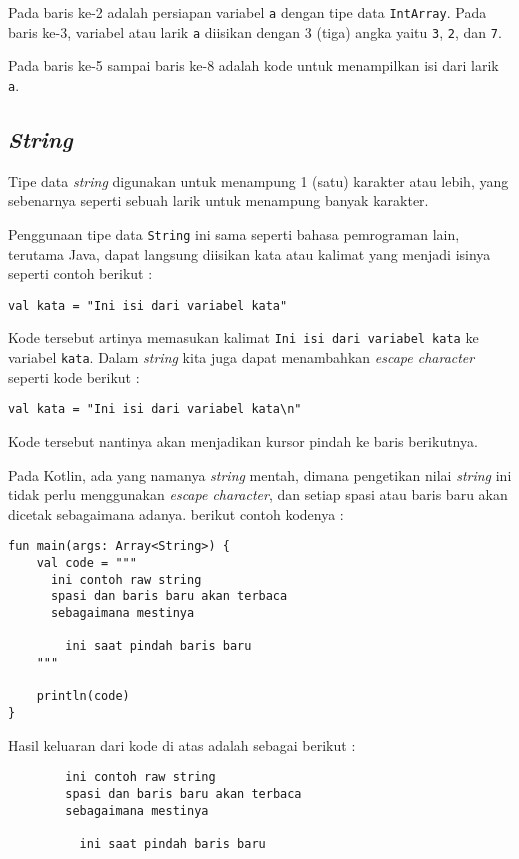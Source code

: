 Pada baris ke-2 adalah persiapan variabel \texttt{a} dengan tipe data \texttt{IntArray}. Pada baris ke-3, variabel atau larik \texttt{a} diisikan dengan 3 (tiga) angka yaitu \texttt{3}, \texttt{2}, dan \texttt{7}.

Pada baris ke-5 sampai baris ke-8 adalah kode untuk menampilkan isi dari larik \texttt{a}.

\subsection{\textit{String}}

Tipe data \textit{string} digunakan untuk menampung 1 (satu) karakter atau lebih, yang sebenarnya seperti sebuah larik untuk menampung banyak karakter.

Penggunaan tipe data \texttt{String} ini sama seperti bahasa pemrograman lain, terutama Java, dapat langsung diisikan kata atau kalimat yang menjadi isinya seperti contoh berikut :

\begin{lstlisting}
val kata = "Ini isi dari variabel kata"
\end{lstlisting}

Kode tersebut artinya memasukan kalimat \texttt{Ini isi dari variabel kata} ke variabel \texttt{kata}. Dalam \textit{string} kita juga dapat menambahkan \textit{escape character} seperti kode berikut :

\begin{lstlisting}
val kata = "Ini isi dari variabel kata\n"
\end{lstlisting}

Kode tersebut nantinya akan menjadikan kursor pindah ke baris berikutnya.

Pada Kotlin, ada yang namanya \textit{string} mentah, dimana pengetikan nilai \textit{string} ini tidak perlu menggunakan \textit{escape character}, dan setiap spasi atau baris baru akan dicetak sebagaimana adanya. berikut contoh kodenya :

\begin{lstlisting}
fun main(args: Array<String>) {
	val code = """
	  ini contoh raw string
	  spasi dan baris baru akan terbaca
	  sebagaimana mestinya
	  
	    ini saat pindah baris baru
	"""
	
	println(code)
}
\end{lstlisting}

Hasil keluaran dari kode di atas adalah sebagai berikut :

\begin{lstlisting}
        ini contoh raw string
        spasi dan baris baru akan terbaca
        sebagaimana mestinya
        
          ini saat pindah baris baru
\end{lstlisting}

